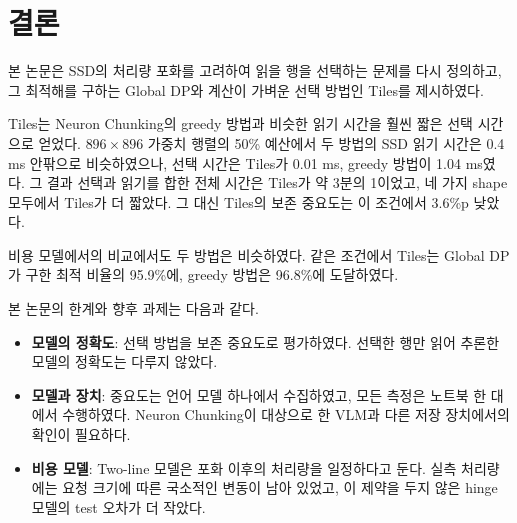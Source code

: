 \chapter{결론}\label{chap:conclusion}

본 논문은 SSD의 처리량 포화를 고려하여 읽을 행을 선택하는 문제를 다시 정의하고, 그 최적해를 구하는 Global DP와 계산이 가벼운 선택 방법인 Tiles를 제시하였다.

Tiles는 Neuron Chunking의 greedy 방법과 비슷한 읽기 시간을 훨씬 짧은 선택 시간으로 얻었다. $896\times896$ 가중치 행렬의 50\% 예산에서 두 방법의 SSD 읽기 시간은 0.4 ms 안팎으로 비슷하였으나, 선택 시간은 Tiles가 0.01 ms, greedy 방법이 1.04 ms였다. 그 결과 선택과 읽기를 합한 전체 시간은 Tiles가 약 3분의 1이었고, 네 가지 shape 모두에서 Tiles가 더 짧았다. 그 대신 Tiles의 보존 중요도는 이 조건에서 3.6\%p 낮았다.

비용 모델에서의 비교에서도 두 방법은 비슷하였다. 같은 조건에서 Tiles는 Global DP가 구한 최적 비율의 95.9\%에, greedy 방법은 96.8\%에 도달하였다.

본 논문의 한계와 향후 과제는 다음과 같다.

\begin{itemize}
\item \textbf{모델의 정확도}: 선택 방법을 보존 중요도로 평가하였다. 선택한 행만 읽어 추론한 모델의 정확도는 다루지 않았다.
\item \textbf{모델과 장치}: 중요도는 언어 모델 하나에서 수집하였고, 모든 측정은 노트북 한 대에서 수행하였다. Neuron Chunking이 대상으로 한 VLM과 다른 저장 장치에서의 확인이 필요하다.
\item \textbf{비용 모델}: Two-line 모델은 포화 이후의 처리량을 일정하다고 둔다. 실측 처리량에는 요청 크기에 따른 국소적인 변동이 남아 있었고, 이 제약을 두지 않은 hinge 모델의 test 오차가 더 작았다.
\end{itemize}
